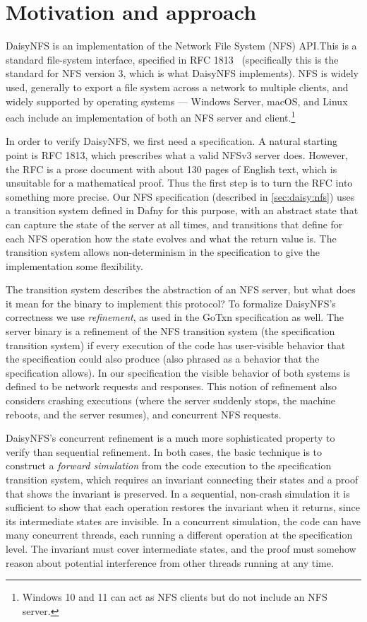 \section{Motivation and approach}%
\label{sec:daisy:motivation}

DaisyNFS is an implementation of the Network File System (NFS) API.\@ This is a
standard file-system interface, specified in RFC 1813~\cite{RFC:1813}
(specifically this is the standard for NFS version 3, which is what DaisyNFS
implements). NFS is widely used, generally to export a file system across a
network to multiple clients, and widely supported by operating systems ---
Windows Server, macOS, and Linux each include an implementation of both an NFS
server and client.\footnote{Windows 10 and 11 can act as NFS clients but do not
include an NFS server.}

In order to verify DaisyNFS, we first need a specification. A natural starting
point is RFC 1813, which prescribes what a valid NFSv3 server
does. However, the RFC is a prose document with about 130 pages of English text,
which is unsuitable for a mathematical proof. Thus the first step is
to turn the RFC into something more precise. Our NFS specification (described in
\cref{sec:daisy:nfs}) uses a
transition system defined in Dafny for this purpose, with an abstract state that
can capture the state of the server at all times, and transitions that define
for each NFS operation how the state evolves and what the return value is. The
transition system allows non-determinism in the specification to give the
implementation some flexibility.

The transition system describes the abstraction of an NFS server, but what does
it mean for the  binary to implement this protocol? To formalize
DaisyNFS's correctness we use \emph{refinement}, as used in the GoTxn
specification as well. The server binary is a refinement of the NFS transition
system (the specification transition system) if every execution of the code has
user-visible behavior that the specification could also produce (also phrased as
a behavior that the specification allows). In our specification the visible
behavior of both systems is defined to be network requests and responses. This
notion of refinement also considers crashing executions (where the server
suddenly stops, the machine reboots, and the server resumes), and concurrent NFS
requests.

DaisyNFS's concurrent refinement is a much more sophisticated property to verify
than sequential refinement. In both cases, the basic technique is to construct a
\emph{forward simulation} from the code execution to the specification
transition system, which requires an invariant connecting their states and a
proof that shows the invariant is preserved. In a sequential, non-crash
simulation it is sufficient to show that each operation restores the invariant
when it returns, since its intermediate states are invisible. In a concurrent
simulation, the code can have many concurrent threads, each running a different
operation at the specification level. The invariant must cover intermediate
states, and the proof must somehow reason about potential interference from
other threads running at any time.

